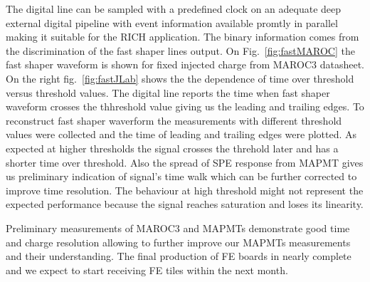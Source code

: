 The digital line can be sampled with a predefined clock on an adequate deep external digital pipeline with event information available promtly in parallel making it suitable for the RICH application.
The binary information comes from the discrimination of the fast shaper lines output.
On Fig.~\ref{fig:fastMAROC} the fast shaper waveform is shown for fixed injected charge from MAROC3 datasheet.
On the right fig.~\ref{fig:fastJLab} shows the the dependence of time over threshold versus threshold values.
The digital line reports the time when fast shaper waveform crosses the thhreshold value giving us the leading and trailing edges.
To reconstruct fast shaper waverform the measurements with different threshold values were collected and the time of leading and trailing edges were plotted.
As expected at higher thresholds the signal crosses the threhold later and has a shorter time over threshold.
Also the spread of SPE response from MAPMT gives us preliminary indication of signal's time walk which can be further corrected to improve time resolution.
The behaviour at high threshold might not represent the expected performance because the signal reaches saturation and loses its linearity.


Preliminary measurements of MAROC3 and MAPMTs demonstrate good time and charge resolution allowing to further improve our MAPMTs measurements and their understanding.
The final production of FE boards in nearly complete and we expect to start receiving FE tiles within the next month.
